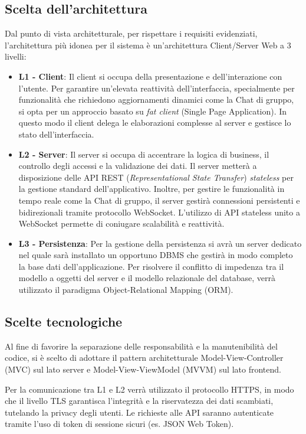 \documentclass[12pt,a4paper]{report}
\begin{document}
\subsection{Scelta dell'architettura}
Dal punto di vista architetturale, per rispettare i requisiti evidenziati, l'architettura più idonea per il sistema è un'architettura Client/Server Web a 3 livelli:

\begin{itemize}
    \item \textbf{L1 - Client}: Il client si occupa della presentazione e dell'interazione con l'utente. Per garantire un'elevata reattività dell'interfaccia, specialmente per funzionalità che richiedono aggiornamenti dinamici come la Chat di gruppo, si opta per un approccio basato su \textit{fat client} (Single Page Application). In questo modo il client delega le elaborazioni complesse al server e gestisce lo stato dell'interfaccia.
    \item \textbf{L2 - Server}: Il server si occupa di accentrare la logica di business, il controllo degli accessi e la validazione dei dati. Il server metterà a disposizione delle API REST (\textit{Representational State Transfer}) \textit{stateless} per la gestione standard dell'applicativo. Inoltre, per gestire le funzionalità in tempo reale come la Chat di gruppo, il server gestirà connessioni persistenti e bidirezionali tramite protocollo WebSocket. L'utilizzo di API stateless unito a WebSocket permette di coniugare scalabilità e reattività.
    \item \label{L3-Persistenza}\textbf{L3 - Persistenza}: Per la gestione della persistenza si avrà un server dedicato nel quale sarà installato un opportuno DBMS che gestirà in modo completo la base dati dell'applicazione. Per risolvere il conflitto di impedenza tra il modello a oggetti del server e il modello relazionale del database, verrà utilizzato il paradigma Object-Relational Mapping (ORM).
\end{itemize}

\subsection{Scelte tecnologiche}
Al fine di favorire la separazione delle responsabilità e la manutenibilità del codice, si è scelto di adottare il pattern architetturale Model-View-Controller (MVC) sul lato server e Model-View-ViewModel (MVVM) sul lato frontend.

Per la comunicazione tra L1 e L2 verrà utilizzato il protocollo HTTPS, in modo che il livello TLS garantisca l'integrità e la riservatezza dei dati scambiati, tutelando la privacy degli utenti. Le richieste alle API saranno autenticate tramite l'uso di token di sessione sicuri (es. JSON Web Token).
\end{document}
